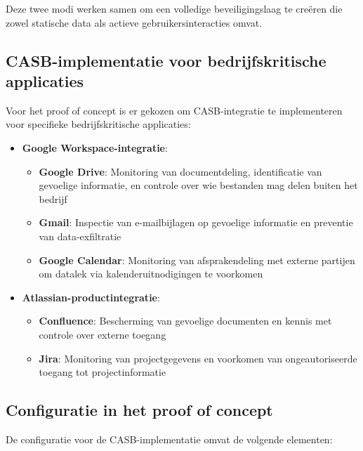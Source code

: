 Deze twee modi werken samen om een volledige beveiligingslaag te creëren die zowel statische data als actieve gebruikersinteracties omvat.

\subsection{CASB-implementatie voor bedrijfskritische applicaties}

Voor het proof of concept is er gekozen om CASB-integratie te implementeren voor specifieke bedrijfskritische applicaties:

\begin{itemize}
    \item \textbf{Google Workspace-integratie}:
        \begin{itemize}
            \item \textbf{Google Drive}: Monitoring van documentdeling, identificatie van gevoelige informatie, en controle over wie bestanden mag delen buiten het bedrijf
            \item \textbf{Gmail}: Inspectie van e-mailbijlagen op gevoelige informatie en preventie van data-exfiltratie
            \item \textbf{Google Calendar}: Monitoring van afsprakendeling met externe partijen om datalek via kalenderuitnodigingen te voorkomen
        \end{itemize}
    \item \textbf{Atlassian-productintegratie}:
        \begin{itemize}
            \item \textbf{Confluence}: Bescherming van gevoelige documenten en kennis met controle over externe toegang
            \item \textbf{Jira}: Monitoring van projectgegevens en voorkomen van ongeautoriseerde toegang tot projectinformatie
        \end{itemize}
\end{itemize}

\subsection{Configuratie in het proof of concept}

De configuratie voor de CASB-implementatie omvat de volgende elementen:

